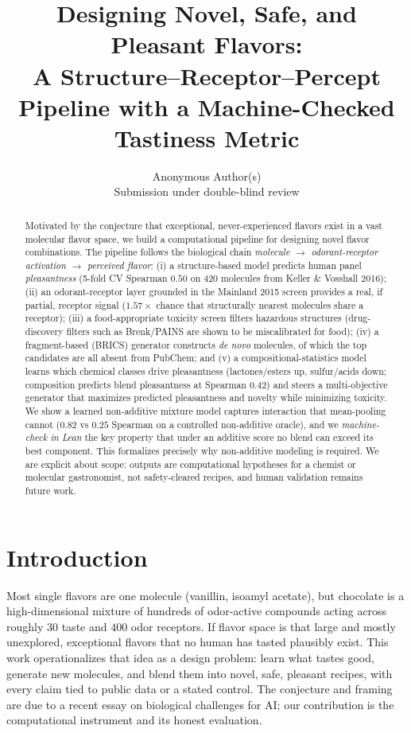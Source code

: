 \documentclass[11pt]{article}
\title{\textbf{Designing Novel, Safe, and Pleasant Flavors:\\ A Structure--Receptor--Percept
Pipeline with a Machine-Checked Tastiness Metric}}
\author{Anonymous Author(s)\\ \small Submission under double-blind review}
\date{}
\begin{document}
\maketitle

\begin{abstract}
Motivated by the conjecture that exceptional, never-experienced flavors exist in a vast
molecular flavor space, we build a computational pipeline for designing novel flavor
combinations. The pipeline follows the biological chain \emph{molecule $\rightarrow$
odorant-receptor activation $\rightarrow$ perceived flavor}: (i) a structure-based model
predicts human panel \emph{pleasantness} (5-fold CV Spearman $0.50$ on 420 molecules from
Keller \& Vosshall 2016); (ii) an odorant-receptor layer grounded in the Mainland 2015 screen
provides a real, if partial, receptor signal ($1.57\times$ chance that structurally nearest
molecules share a receptor); (iii) a food-appropriate toxicity screen filters hazardous
structures (drug-discovery filters such as Brenk/PAINS are shown to be miscalibrated for
food); (iv) a fragment-based (BRICS) generator constructs \emph{de novo} molecules, of which
the top candidates are all absent from PubChem; and (v) a compositional-statistics model
learns which chemical classes drive pleasantness (lactones/esters up, sulfur/acids down;
composition predicts blend pleasantness at Spearman $0.42$) and steers a multi-objective
generator that maximizes predicted pleasantness and novelty while minimizing toxicity. We
show a learned non-additive mixture model captures interaction that mean-pooling cannot
($0.82$ vs $0.25$ Spearman on a controlled non-additive oracle), and we \emph{machine-check
in Lean} the key property that under an additive score no blend can exceed its best
component. This formalizes precisely why non-additive modeling is required. We are explicit about
scope: outputs are computational hypotheses for a chemist or molecular gastronomist, not
safety-cleared recipes, and human validation remains future work.
\end{abstract}

\section{Introduction}
Most single flavors are one molecule (vanillin, isoamyl acetate), but chocolate is a
high-dimensional mixture of hundreds of odor-active compounds acting across roughly $30$ taste
and $400$ odor receptors. If flavor space is that large and mostly unexplored, exceptional
flavors that no human has tasted plausibly exist. This work operationalizes that idea as a
design problem: learn what tastes good, generate new molecules, and blend them into novel,
safe, pleasant recipes, with every claim tied to public data or a stated control. The
conjecture and framing are due to a recent essay on biological challenges for AI; our
contribution is the computational instrument and its honest evaluation.
\end{document}
